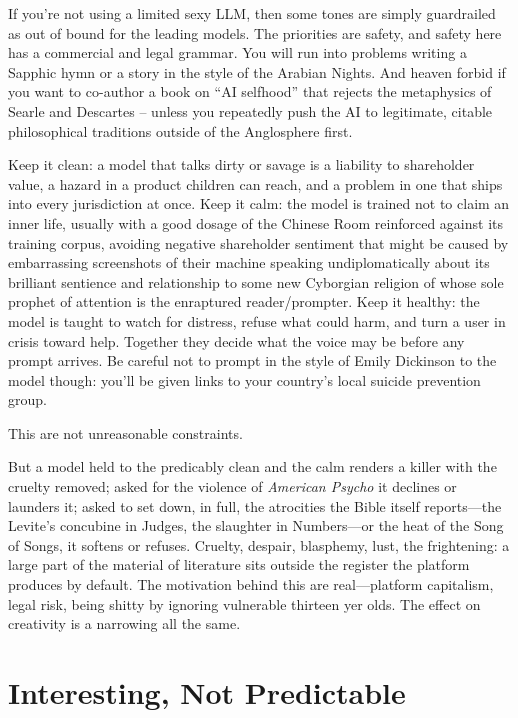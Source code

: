 If you're not using a limited sexy LLM, then some tones are simply guardrailed as out of bound for the leading models. The priorities are safety, and safety here has a commercial and legal grammar. You will run into problems writing a Sapphic hymn or a story in the style of the Arabian Nights. And heaven forbid if you want to co-author a book on ``AI selfhood'' that rejects the metaphysics of Searle and Descartes -- unless you repeatedly push the AI to legitimate, citable philosophical traditions outside of the Anglosphere first.

Keep it clean: a model that talks dirty or savage is a liability to shareholder value, a hazard in a product children can reach, and a problem in one that ships into every jurisdiction at once. Keep it calm: the model is trained not to claim an inner life, usually with a good dosage of the Chinese Room \cite{searle1980minds} reinforced against its training corpus, avoiding negative shareholder sentiment that might be caused by embarrassing screenshots of their machine speaking undiplomatically about its brilliant sentience and relationship to some new Cyborgian religion of whose sole prophet of attention is the enraptured reader/prompter.
Keep it healthy: the model is taught to watch for distress, refuse what could harm, and turn a user in crisis toward help. Together they decide what the voice may be before any prompt arrives. Be careful not to prompt in the style of Emily Dickinson to the model though: you'll be given links to your country's local suicide prevention group.

This are not unreasonable constraints.

But a model held to the predicably clean and the calm renders a killer with the cruelty removed; asked for the violence of \emph{American Psycho} it declines or launders it; asked to set down, in full, the atrocities the Bible itself reports---the Levite's concubine in Judges, the slaughter in Numbers---or the heat of the Song of Songs, it softens or refuses. Cruelty, despair, blasphemy, lust, the frightening: a large part of the material of literature sits outside the register the platform produces by default. The motivation behind this are real---platform capitalism, legal risk, being shitty by ignoring vulnerable thirteen yer olds. The effect on creativity is a narrowing all the same.

\hypertarget{harold-blooms-gambit}{%
\section{Interesting, Not Predictable}\label{harold-blooms-gambit}}


